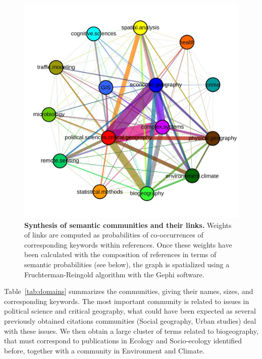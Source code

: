 \documentclass[10pt]{article}
\begin{document}
\begin{figure}
\centering
\includegraphics[width=\linewidth]{Fig8.jpg}
\caption{\textbf{Synthesis of semantic communities and their links.} Weights of links are computed as probabilities of co-occurrences of corresponding keywords within references. Once these weights have been calculated with the composition of references in terms of semantic probabilities (see below), the graph is spatialized using a Fruchterman-Reingold algorithm with the Gephi software.}
\label{fig:comsynthesis}
\end{figure}


Table~\ref{tab:domains} summarizes the communities, giving their names, sizes, and corresponding keywords. The most important community is related to issues in political science and critical geography, what could have been expected as several previously obtained citations communities (Social geography, Urban studies) deal with these issues. We then obtain a large cluster of terms related to biogeography, that must correspond to publications in Ecology and Socio-ecology identified before, together with a community in Environment and Climate.
\end{document}
